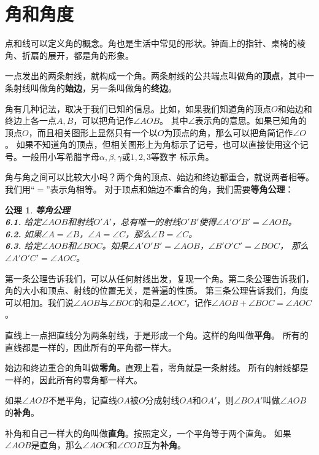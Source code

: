 \documentclass[12pt,UTF8]{ctexbook}
\newtheorem{po}{公理}
\begin{document}
\section{角和角度}
点和线可以定义角的概念。角也是生活中常见的形状。钟面上的指针、桌椅的棱角、折扇的展开，都是角的形象。

一点发出的两条射线，就构成一个角。两条射线的公共端点叫做角的\textbf{顶点}，其中一条射线叫做角的\textbf{始边}，另一条叫做角的\textbf{终边}。

角有几种记法，取决于我们已知的信息。比如，如果我们知道角的顶点$O$和始边和终边上各一点$A,B$，可以把角记作$\angle AOB$。
其中$\angle$表示角的意思。如果已知角的顶点$O$，而且相关图形上显然只有一个以$O$为顶点的角，那么可以把角简记作$\angle O$。
如果不知道角的顶点，但相关图形上为角标示了记号，也可以直接使用这个记号。一般用小写希腊字母$\alpha, \beta, \gamma$或$1,2,3$等数字
标示角。

角与角之间可以比较大小吗？两个角的顶点、始边和终边都重合，就说两者相等。我们用“$=$”表示角相等。
对于顶点和始边不重合的角，我们需要\textbf{等角公理}：
\begin{po}{\textbf{等角公理}}\label{po:5}
    \mbox{}\\
    \indent \textbf{6.1.} 给定$\angle AOB$和射线$O'A'$，总有唯一的射线$O'B'$使得$\angle A'O'B' = \angle AOB$。\\
    \indent \textbf{6.2.} 如果$\angle A = \angle B$，$\angle A = \angle C$，那么$\angle B = \angle C$。\\
    \indent \textbf{6.3.} 给定$\angle AOB$和$\angle BOC$。如果$\angle A'O'B' = \angle AOB$，$\angle B'O'C' = \angle BOC$，
    那么$\angle A'O'C' = \angle AOC$。
\end{po}
第一条公理告诉我们，可以从任何射线出发，复现一个角。第二条公理告诉我们，角的大小和顶点、射线的位置无关，是普遍的性质。
第三条公理告诉我们，角度可以相加。我们说$\angle AOB$与$\angle BOC$的和是$\angle AOC$，记作$\angle AOB + \angle BOC = \angle AOC$。

直线上一点把直线分为两条射线，于是形成一个角。这样的角叫做\textbf{平角}。
所有的直线都是一样的，因此所有的平角都一样大。

始边和终边重合的角叫做\textbf{零角}。直观上看，零角就是一条射线。
所有的射线都是一样的，因此所有的零角都一样大。

如果$\angle AOB$不是平角，记直线$OA$被$O$分成射线$OA$和$OA'$，则$\angle BOA'$叫做$\angle AOB$的\textbf{补角}。

补角和自己一样大的角叫做\textbf{直角}。按照定义，一个平角等于两个直角。
如果$\angle AOB$是直角，那么$\angle AOC$和$\angle COB$互为\textbf{补角}。
\end{document}
